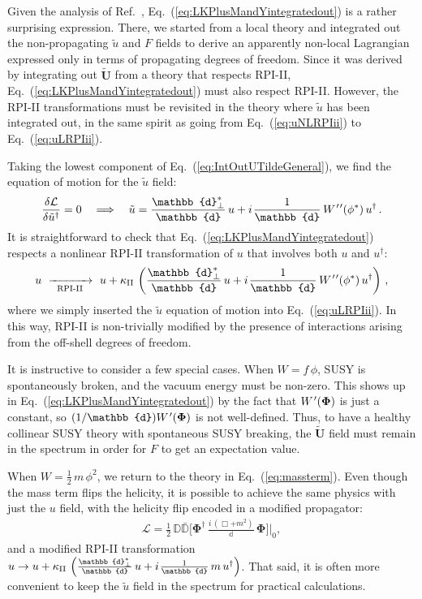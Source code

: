 \documentclass[12pt,document,nofootinbib,superscriptaddress,onecolumn,preprintnumbers,balancelastpage]{article}
\newcommand{\rpiii}{{\kappa_\text{II}}}
\newcommand{\s}{\hspace{0.8pt}}
\newcommand{\PP}{\mathbb{d}}
\newcommand{\RPIii}{\,\,\xrightarrow[\hspace{5pt}\text{RPI-II}\hspace{5pt}]{}\,\,}
\DeclareRobustCommand{\Eq}[1]{Eq.~(\ref{#1})}
\DeclareRobustCommand{\Ref}[1]{Ref.~\cite{#1}}
\newcommand{\bPhi}{ \boldsymbol \Phi}
\newcommand{\bU}{ \tilde{\boldsymbol U}}
\newcommand{\D}{\mathbb{D}}
\newcommand{\uu}{\tilde u}
\begin{document}
\begin{spacing}{1.2}
Given the analysis of \Ref{Cohen:2018qvn}, \Eq{eq:LKPlusMandYintegratedout} is a rather surprising expression.
%
There, we started from a local theory and integrated out the non-propagating $\uu$ and $F$ fields to derive an apparently non-local Lagrangian expressed only in terms of propagating degrees of freedom.
%
Since it was derived by integrating out $\bU$ from a theory that respects RPI-II, \Eq{eq:LKPlusMandYintegratedout} must also respect RPI-II.  
%
However, the RPI-II transformations must be revisited in the theory where $\uu$ has been integrated out, in the same spirit as going from \Eq{eq:uNLRPIii} to \Eq{eq:uLRPIii}.
%


Taking the lowest component of \Eq{eq:IntOutUTildeGeneral}, we find the equation of motion for the $\uu$ field:
%
\begin{align}
\frac{\delta \mathcal{L} }{\delta \uu^\dagger} = 0 \quad \Longrightarrow \quad \uu = \frac{\PP_\perp^*}{\PP}\, u + i\s   \frac{1}{\PP}\, W^{\s\prime\s\prime}(\phi^*)\, u^\dagger \,.
\label{eq:IntOutUTildeGenerallowest}
\end{align}
%
It is straightforward to check that \Eq{eq:LKPlusMandYintegratedout} respects a nonlinear RPI-II transformation of $u$ that involves both $u$ and $u^\dagger$:
%
\begin{equation}
u  \RPIii u + \rpiii \, \left(\frac{\PP_\perp^*}{\PP}\, u + i \s  \frac{1}{\PP}\, W^{\s\prime\s\prime}(\phi^*)\, u^\dagger \right)\,,
\end{equation}
%
where we simply inserted the $\uu$ equation of motion into \Eq{eq:uLRPIii}.
%
In this way, RPI-II is non-trivially modified by the presence of interactions arising from the off-shell degrees of freedom. 


It is instructive to consider a few special cases.
%
When $W = f\, \phi$, SUSY is spontaneously broken, and the vacuum energy must be non-zero.
%
This shows up in \Eq{eq:LKPlusMandYintegratedout} by the fact that $W^{\s\prime}(\bPhi)$ is just a constant, so $(1/\PP) W^{\s\prime}(\bPhi)$ is not well-defined.
%
Thus, to have a healthy collinear SUSY theory with spontaneous SUSY breaking, the $\bU$ field must remain in the spectrum in order for $F$ to get an expectation value.


When $W = \frac{1}{2}\, m\, \phi^2$, we return to the theory in \Eq{eq:massterm}.
%
Even though the mass term flips the helicity, it is possible to achieve the same physics with just the $u$ field, with the helicity flip encoded in a modified propagator:
%
\begin{align}
\label{eq:LKPlusMandYintegratedoutJustmass}
\mathcal{L} =  \frac{1}{2} \,\D \bar{\D} \bigg[ \bPhi^\dagger\, \frac{i\, (\Box + m^2)}{\PP}\, \bPhi \bigg] \bigg|_{0},
\end{align}
and a modified RPI-II transformation $u \to u + \rpiii \, \left(\frac{\PP_\perp^*}{\PP}\, u + i \s  \frac{1}{\PP}\, m\, u^\dagger \right)$.
%
That said, it is often more convenient to keep the $\uu$ field in the spectrum for practical calculations.



\end{spacing}
\end{document}
